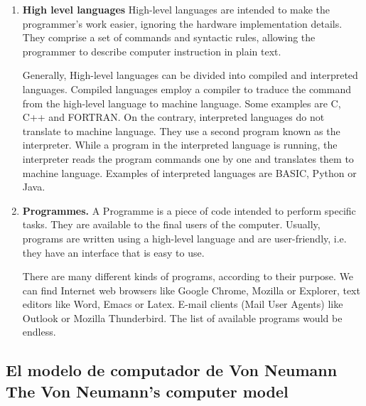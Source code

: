 \begin{paracol}{2}
\begin{enumerate}
\item \textbf{High level languages} 
High-level languages are intended to make the programmer's work easier, ignoring the hardware implementation details.   They comprise a set of commands and syntactic rules, allowing the programmer to describe computer instruction in plain text.

Generally, High-level languages can be divided into compiled and interpreted languages. Compiled languages employ a compiler to traduce the command from the high-level language to machine language. Some examples are C, C++ and FORTRAN. On the contrary, interpreted languages do not translate to machine language. They use a second program known as the interpreter. While a program in the interpreted language is running, the interpreter reads the program commands one by one and translates them to machine language. Examples of interpreted languages are BASIC, Python or Java.  


\item \textbf{Programmes.}  
A Programme is a piece of code intended to perform specific tasks. They are available to the final users of the computer. Usually, programs are written using a high-level language and are user-friendly, i.e. they have an interface that is easy to use.

There are many different kinds of programs, according to their purpose. We can find Internet web browsers like Google Chrome, Mozilla or Explorer, text editors like Word, Emacs or Latex.    
E-mail clients (Mail User Agents) like Outlook or Mozilla Thunderbird. The list of available programs would be endless. 
\end{enumerate}

\end{paracol}


\subsection{El modelo de computador de Von Neumann\\ The Von Neumann's computer model} 

